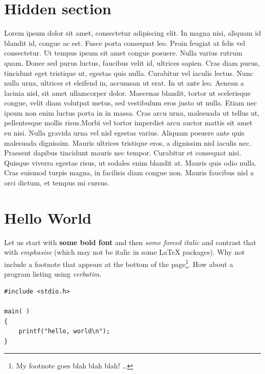 \clearpage

\tochide\section{Hidden section}

Lorem ipsum dolor sit amet, consectetur adipiscing elit. In magna nisi, aliquam id blandit id, congue ac est. Fusce porta consequat leo. Proin feugiat at felis vel consectetur. Ut tempus ipsum sit amet congue posuere. Nulla varius rutrum quam. Donec sed purus luctus, faucibus velit id, ultrices sapien. Cras diam purus, tincidunt eget tristique ut, egestas quis nulla. Curabitur vel iaculis lectus. Nunc nulla urna, ultrices et eleifend in, accumsan ut erat. In ut ante leo. Aenean a lacinia nisl, sit amet ullamcorper dolor. Maecenas blandit, tortor ut scelerisque congue, velit diam volutpat metus, sed vestibulum eros justo ut nulla. Etiam nec ipsum non enim luctus porta in in massa. Cras arcu urna, malesuada ut tellus ut, pellentesque mollis risus.Morbi vel tortor imperdiet arcu auctor mattis sit amet eu nisi. Nulla gravida urna vel nisl egestas varius. Aliquam posuere ante quis malesuada dignissim. Mauris ultrices tristique eros, a dignissim nisl iaculis nec. Praesent dapibus tincidunt mauris nec tempor. Curabitur et consequat nisi. Quisque viverra egestas risus, ut sodales enim blandit at. Mauris quis odio nulla. Cras euismod turpis magna, in facilisis diam congue non. Mauris faucibus nisl a orci dictum, et tempus mi cursus.

\section{Hello World}

Let us start with \textbf{some bold font} and then \textit{some forced italic} and contrast that with \emph{emphasise} (which may not be italic in some \LaTeX{} packages). Why not include a footnote that appears at the bottom of the page\footnote{My footnote goes blah blah blah! \dots}. How about a program listing using \emph{verbatim}.

\begin{verbatim} 
#include <stdio.h>

main( )
{
    printf("hello, world\n");
}
\end{verbatim}

